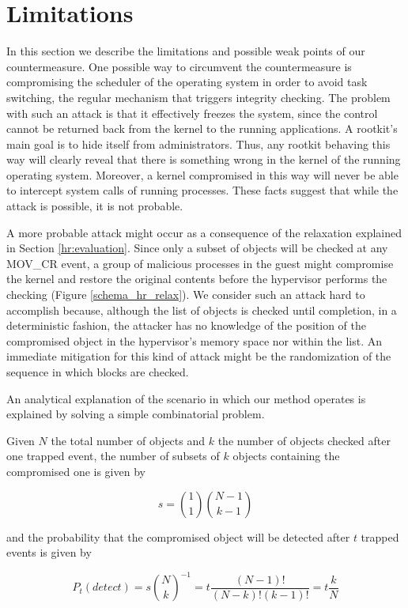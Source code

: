 \section{Limitations}\label{hr:limitations}
In this section we describe the limitations and possible weak points of our countermeasure.
One possible way to circumvent the countermeasure is compromising the scheduler of the operating system in order to avoid task switching, the regular mechanism that triggers integrity checking. The problem with such an attack is that it effectively freezes the system, since the control cannot be returned back from the kernel to the running applications.
A rootkit's main goal is to hide itself from administrators. Thus, any rootkit behaving this way will clearly reveal that there is something wrong in the kernel of the running operating system. Moreover, a kernel compromised in this way will never be able to intercept system calls of running processes. These facts suggest that while the attack is possible, it is not probable.

A more probable attack might occur as a consequence of the relaxation explained in Section \ref{hr:evaluation}.
Since only a subset of objects will be checked at any MOV\_CR event, a group of malicious processes in the guest might compromise the kernel and restore the original contents before the hypervisor performs the checking (Figure \ref{schema_hr_relax}).
We consider such an attack hard to accomplish because, although the list of objects is checked until completion, in a deterministic fashion, the attacker has no knowledge of the position of the compromised object in the hypervisor's memory space nor within the list.
An immediate mitigation for this kind of attack might be the randomization of the sequence in which blocks are checked.

An analytical explanation of the scenario in which our method operates is explained by solving a simple combinatorial problem.
  
Given $N$ the total number of objects and $k$ the number of objects checked after one trapped event,  the number of subsets of $k$ objects containing the compromised one is given by

$$ s = \binom{1}{1} \binom{N-1}{k-1} $$ 

and the probability that the compromised object will be detected after $t$ trapped events is given by

$$P_t(detect) = s {\binom{N}{k}}^{-1}= t \frac{(N-1)!}{(N-k)!(k-1)!} = t \frac{k}{N}$$


